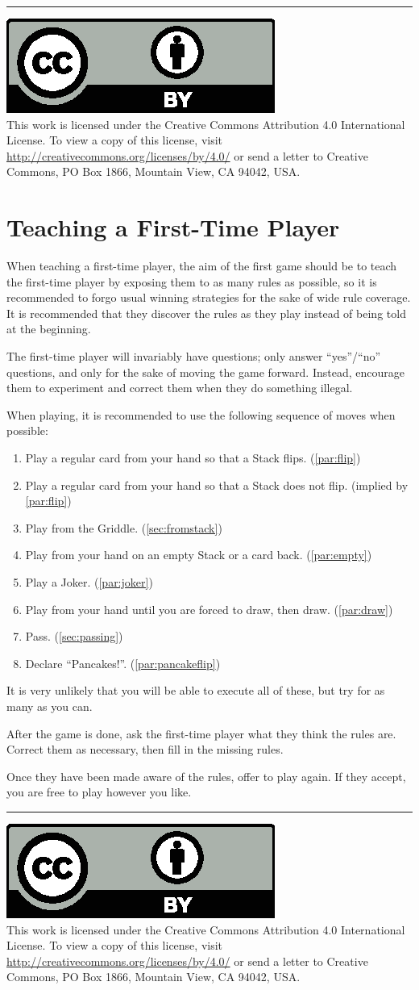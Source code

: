 \documentclass{article}
\newcommand\copyrightfooter{
  \medskip
  \hrule

  {
    \small
    \includegraphics[scale=0.5]{cc-by.eps}\\
    This work is licensed under the Creative Commons Attribution 4.0
    International License. To view a copy of this license, visit
    \url{http://creativecommons.org/licenses/by/4.0/} or send a letter to Creative Commons, PO Box 1866, Mountain View, CA 94042, USA.
  }
}
\begin{document}
\copyrightfooter

\newpage
\appendix
\renewcommand{\thesection}{\Alph{section}}

\section{Teaching a First-Time Player}
\label{appendix:firsttime}

When teaching a first-time player, the aim of the first game should be to teach the first-time player by exposing them to as many rules as possible, so it is recommended to forgo usual winning strategies for the sake of wide rule coverage. It is recommended that they discover the rules as they play instead of being told at the beginning.

The first-time player will invariably have questions; only answer ``yes''/``no'' questions, and only for the sake of moving the game forward. Instead, encourage them to experiment and correct them when they do something illegal.

When playing, it is recommended to use the following sequence of moves when possible:

\begin{enumerate}
  \item Play a regular card from your hand so that a Stack flips. (\autoref{par:flip})
  \item Play a regular card from your hand so that a Stack does not flip. (implied by \autoref{par:flip})
  \item Play from the Griddle. (\autoref{sec:fromstack})
  \item Play from your hand on an empty Stack or a card back. (\autoref{par:empty})
  \item Play a Joker. (\autoref{par:joker})
  \item Play from your hand until you are forced to draw, then draw. (\autoref{par:draw})
  \item Pass. (\autoref{sec:passing})
  \item Declare ``Pancakes!''. (\autoref{par:pancakeflip})
\end{enumerate}

It is very unlikely that you will be able to execute all of these, but try for as many as you can.

After the game is done, ask the first-time player what they think the rules are. Correct them as necessary, then fill in the missing rules.

Once they have been made aware of the rules, offer to play again. If they accept, you are free to play however you like.

\copyrightfooter
\end{document}
